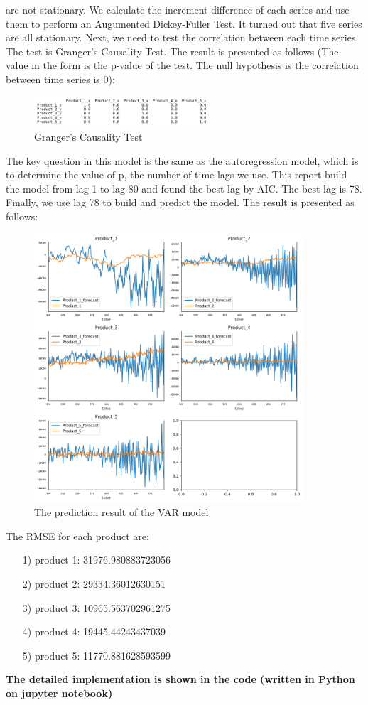 \documentclass{article}
\begin{document}
are not stationary. We calculate the increment difference of each series and use them to perform an Augumented Dickey-Fuller Test. It turned out that five series are all stationary.
Next, we need to test the correlation between each time series. The test is Granger's Causality Test. The result is presented as follows (The value in the form is the p-value of the test. The null hypothesis is the correlation between time series is 0):
\begin{figure}[htbp]\centering
	\includegraphics[width=6.5cm]{p-vbalue.png}
	\caption{Granger's Causality Test}
	\label{fig: VAR}
\end{figure}
The key question in this model is the same as the autoregression model, which is to determine the value of p, the number of time lags we use.
This report build the model from lag 1 to lag 80 and found the best lag by AIC. The best lag is 78. 
Finally, we use lag 78 to build and predict the model. The result is presented as follows:
\begin{figure}[htbp]\centering
	\includegraphics[width=10cm]{Final_res.png}
	\caption{The prediction result of the VAR model}
	\label{fig: VAR}
\end{figure}
The RMSE for each product are:
\begin{itemize}
	\item [1)] product 1: 31976.980883723056
	\item [2)] product 2: 29334.36012630151
	\item [3)] product 3: 10965.563702961275
	\item [4)] product 4: 19445.44243437039
	\item [5)] product 5: 11770.881628593599
\end{itemize}

\textbf{The detailed implementation is shown in the code (written in Python on jupyter notebook)}
\end{document}

